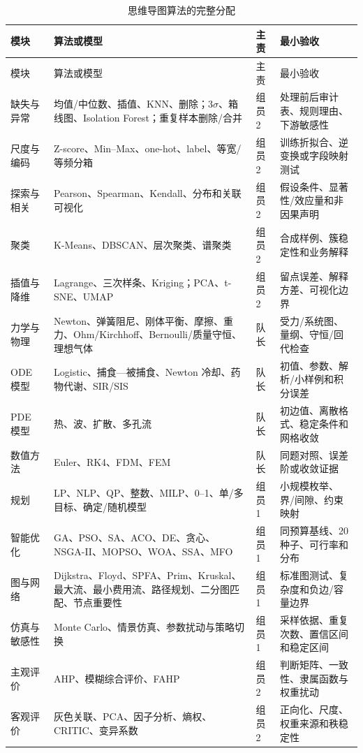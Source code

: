 \documentclass[UTF8,a4paper,12pt]{ctexart}
\begin{document}
\begin{longtable}{p{2.1cm}p{5.0cm}p{2.0cm}p{5.5cm}}
\caption{思维导图算法的完整分配}\label{tab:algorithm-owner}\\
\toprule
模块 & 算法或模型 & 主责 & 最小验收\\
\midrule
\endfirsthead
\toprule
模块 & 算法或模型 & 主责 & 最小验收\\
\midrule
\endhead
缺失与异常 & 均值/中位数、插值、KNN、删除；$3\sigma$、箱线图、Isolation Forest；重复样本删除/合并 & 组员2 & 处理前后审计表、规则理由、下游敏感性\\
尺度与编码 & Z-score、Min--Max、one-hot、label、等宽/等频分箱 & 组员2 & 训练折拟合、逆变换或字段映射测试\\
探索与相关 & Pearson、Spearman、Kendall、分布和关联可视化 & 组员2 & 假设条件、显著性/效应量和非因果声明\\
聚类 & K-Means、DBSCAN、层次聚类、谱聚类 & 组员2 & 合成样例、簇稳定性和业务解释\\
插值与降维 & Lagrange、三次样条、Kriging；PCA、t-SNE、UMAP & 组员2 & 留点误差、解释方差、可视化边界\\
力学与物理 & Newton、弹簧阻尼、刚体平衡、摩擦、重力、Ohm/Kirchhoff、Bernoulli/质量守恒、理想气体 & 队长 & 受力/系统图、量纲、守恒/回代检查\\
ODE 模型 & Logistic、捕食—被捕食、Newton 冷却、药物代谢、SIR/SIS & 队长 & 初值、参数、解析/小样例和积分误差\\
PDE 模型 & 热、波、扩散、多孔流 & 队长 & 初边值、离散格式、稳定条件和网格收敛\\
数值方法 & Euler、RK4、FDM、FEM & 队长 & 同题对照、误差阶或收敛证据\\
规划 & LP、NLP、QP、整数、MILP、0--1、单/多目标、确定/随机模型 & 组员1 & 小规模枚举、界/间隙、约束映射\\
智能优化 & GA、PSO、SA、ACO、DE、贪心、NSGA-II、MOPSO、WOA、SSA、MFO & 组员1 & 同预算基线、20 种子、可行率和分布\\
图与网络 & Dijkstra、Floyd、SPFA、Prim、Kruskal、最大流、最小费用流、路径规划、二分图匹配、节点重要性 & 组员1 & 标准图测试、复杂度和负边/容量边界\\
仿真与敏感性 & Monte Carlo、情景仿真、参数扰动与策略切换 & 组员1 & 采样依据、重复次数、置信区间和稳定区间\\
主观评价 & AHP、模糊综合评价、FAHP & 组员2 & 判断矩阵、一致性、隶属函数与权重扰动\\
客观评价 & 灰色关联、PCA、因子分析、熵权、CRITIC、变异系数 & 组员2 & 正向化、尺度、权重来源和秩稳定性\\

\end{longtable}
\end{document}
